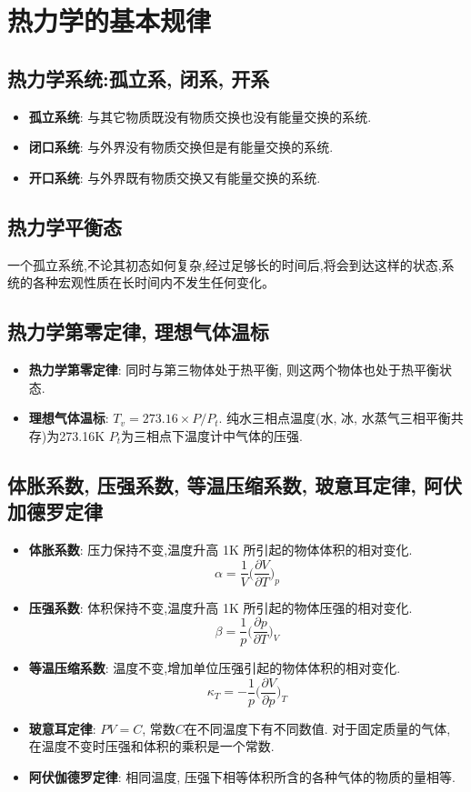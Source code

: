 \section{热力学的基本规律}

\subsection{热力学系统:孤立系, 闭系, 开系}
\begin{itemize}
\item \textbf{孤立系统}: 与其它物质既没有物质交换也没有能量交换的系统.
\item \textbf{闭口系统}: 与外界没有物质交换但是有能量交换的系统.
\item \textbf{开口系统}: 与外界既有物质交换又有能量交换的系统.
\end{itemize}

\subsection{热力学平衡态}
一个孤立系统,不论其初态如何复杂,经过足够长的时间后,将会到达这样的状态,系统的各种宏观性质在长时间内不发生任何变化。

\subsection{热力学第零定律, 理想气体温标}
\begin{itemize}
\item \textbf{热力学第零定律}: 同时与第三物体处于热平衡, 则这两个物体也处于热平衡状态.
\item \textbf{理想气体温标}: $T_v = 273.16\times P/P_t$. 纯水三相点温度(水, 冰, 水蒸气三相平衡共存)为273.16K
$P_t$为三相点下温度计中气体的压强.
\end{itemize}

\subsection{体胀系数, 压强系数, 等温压缩系数, 玻意耳定律, 阿伏加德罗定律}
\begin{itemize}
\item \textbf{体胀系数}: 压力保持不变,温度升高 1K 所引起的物体体积的相对变化.
\[
\alpha = \frac{1}{V}\bigg(\frac{\partial V}{\partial T}\bigg)_p
\]
\item \textbf{压强系数}: 体积保持不变,温度升高 1K 所引起的物体压强的相对变化.
\[
\beta = \frac{1}{p}\bigg(\frac{\partial p}{\partial T}\bigg)_V
\]
\item \textbf{等温压缩系数}: 温度不变,增加单位压强引起的物体体积的相对变化.
\[
\kappa_T = -\frac{1}{p}\bigg(\frac{\partial V}{\partial p}\bigg)_T
\]
\item \textbf{玻意耳定律}: $PV=C$, 常数$C$在不同温度下有不同数值. 对于固定质量的气体, 在温度不变时压强和体积的乘积是一个常数.
\item \textbf{阿伏伽德罗定律}: 相同温度, 压强下相等体积所含的各种气体的物质的量相等.
\end{itemize}
